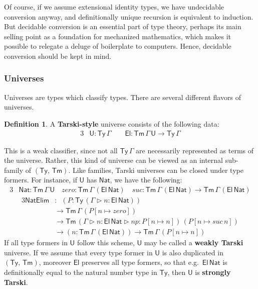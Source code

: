 \documentclass[12pt,a4paper,twoside,openany]{book}
\theoremstyle{remark}
\theoremstyle{definition}
\newtheorem{mydefinition}{Definition}
\newcommand{\mi}[1]{\mathit{#1}}
\newcommand{\ms}[1]{\mathsf{#1}}
\newcommand{\Tm}{\mathsf{Tm}}
\newcommand{\Ty}{\mathsf{Ty}}
\newcommand{\U}{\mathsf{U}}
\newcommand{\El}{\mathsf{El}}
\newcommand{\ext}{\triangleright}
\newcommand{\Nat}{\ms{Nat}}
\begin{document}
Of course, if we assume extensional identity types, we have undecidable
conversion anyway, and definitionally unique recursion is equivalent to
induction. But decidable conversion is an essential part of type theory, perhaps
its main selling point as a foundation for mechanized mathematics, which makes
it possible to relegate a deluge of boilerplate to computers. Hence, decidable
conversion should be kept in mind.

\subsubsection{Universes}

Universes are types which classify types. There are several different flavors of
universes.

\begin{mydefinition} A \textbf{Tarski-style} universe consists of
the following data:
\begin{alignat*}{3}
  & \U : \Ty\,\Gamma\hspace{2em}\El : \Tm\,\Gamma\,\U \to \Ty\,\Gamma
\end{alignat*}
\end{mydefinition}
This is a weak classifier, since not all $\Ty\,\Gamma$ are necessarily
represented as terms of the universe. Rather, this kind of universe can be
viewed as an internal sub-family of $(\Ty,\,\Tm)$. Like families, Tarski
universes can be closed under type formers. For instance, if $\U$ has $\Nat$,
we have the following:
\begin{alignat*}{3}
  &\Nat : \Tm\,\Gamma\,\U
    \hspace{1em}\mi{zero} : \Tm\,\Gamma\,(\El\,\Nat)
    \hspace{1em}\mi{suc} : \Tm\,\Gamma\,(\El\,\Nat) \to \Tm\,\Gamma\,(\El\,\Nat)
\end{alignat*}
\vspace{-2em}
\begin{alignat*}{3}
  \ms{NatElim} &:\,\,\,(P : \Ty\,(\Gamma\ext n : \El\,\Nat))\\
  &\to \Tm\,\Gamma\,(P[n \mapsto \mi{zero}])\\
  &\to \Tm\,(\Gamma\ext n : \El\,\Nat \ext \mi{np} : P[n \mapsto n])\,(P[n \mapsto \mi{suc}\,n]) \\
  &\to (n : \Tm\,\Gamma\,(\El\,\Nat)) \to \Tm\,\Gamma\,(P[n \mapsto n])
\end{alignat*}
If all type formers in $\U$ follow this scheme, $\U$ may be called a
\textbf{weakly Tarski} universe. If we assume that every type former in $\U$ is
also duplicated in $(\Ty,\,\Tm)$, moreover $\El$ preserves all type formers, so
that e.g.\ $\El\,\Nat$ is definitionally equal to the natural number type in
$\Ty$, then $\U$ is \textbf{strongly Tarski}.
\end{document}
